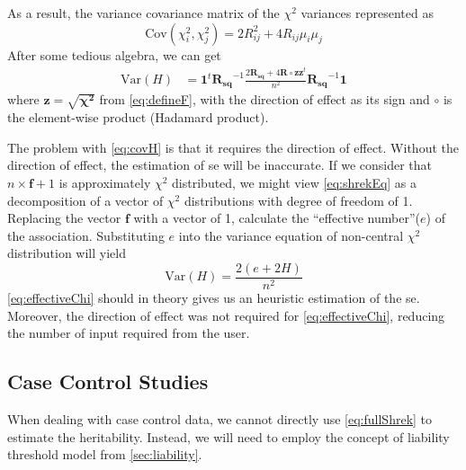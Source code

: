 			As a result, the variance covariance matrix of the $\chi^2$ variances represented as
			\begin{equation}
				\mathrm{Cov}(\chi_i^2,\chi_j^2) = 2R_{ij}^2+4R_{ij}\mu_i\mu_j
				\label{eq:finalChi}
			\end{equation}
			After some tedious algebra, we can get 
			\begin{align}
				\mathrm{Var}(H) &=\boldsymbol{1}^t\boldsymbol{R_{sq}}^{-1}\frac{2\boldsymbol{R_{sq}}+4\boldsymbol{R}\circ \boldsymbol{zz}^t}{n^2}\boldsymbol{R_{sq}}^{-1}\boldsymbol{1}
				\label{eq:covH}
			\end{align}
			where $\boldsymbol{z} = \sqrt{\boldsymbol{\chi^2}}$ from \cref{eq:defineF}, with the direction of effect as its sign and $\circ$ is the element-wise product (Hadamard product).
			 
			The problem with \cref{eq:covH} is that it requires the direction of effect. 
			Without the direction of effect, the estimation of \gls{se} will be inaccurate. 
			If we consider that $n\times \boldsymbol{f}+1$ is approximately $\chi^2$ distributed, we might view \cref{eq:shrekEq} as a decomposition of a vector of $\chi^2$ distributions with degree of freedom of 1. 
			Replacing the vector $\boldsymbol{f}$ with a vector of 1, calculate the ``effective number''($e$) of the association\citep{Li2011}. 
			Substituting $e$ into the variance equation of non-central $\chi^2$ distribution will yield
			\begin{equation}
			\mathrm{Var}(H) = \frac{2(e+2H)}{n^2}
			\label{eq:effectiveChi}
			\end{equation}
			\cref{eq:effectiveChi} should in theory gives us an heuristic estimation of the \gls{se}. 
			Moreover, the direction of effect was not required for \cref{eq:effectiveChi}, reducing the number of input required from the user.
			
		\subsection{Case Control Studies}	 
			When dealing with case control data, we cannot directly use \cref{eq:fullShrek} to estimate the heritability.
			Instead, we will need to employ the concept of liability threshold model from \cref{sec:liability}. 
			

